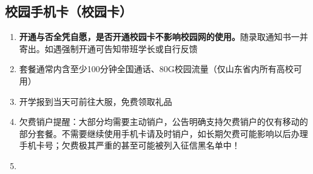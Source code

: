 \subsection[校园手机卡（校园卡）]{校园手机卡（校园卡）}
\begin{enumerate}
    \item \textbf{开通与否全凭自愿，是否开通校园卡不影响校园网的使用。}随录取通知书一并寄出。如遇强制开通可告知带班学长或自行反馈
    \item 套餐\footnotemark 通常内含至少100分钟全国通话、80G校园流量（仅山东省内所有高校可用）
    \item 开学报到当天可前往大服，免费领取礼品
    \item 欠费销户提醒：大部分均需要主动销户，公告明确支持欠费销户的仅有移动的部分套餐。不需要继续使用手机卡请及时销户，如长期欠费可能影响以后办理手机卡号；欠费极其严重的甚至可能被列入征信黑名单中！
    \item \textbf{}
\end{enumerate}

